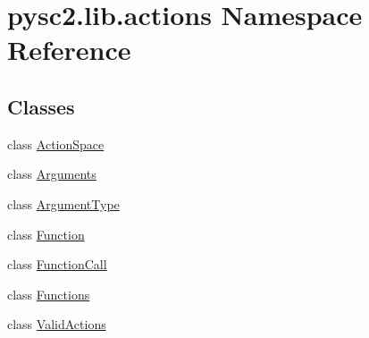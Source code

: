 \hypertarget{namespacepysc2_1_1lib_1_1actions}{}\section{pysc2.\+lib.\+actions Namespace Reference}
\label{namespacepysc2_1_1lib_1_1actions}
\subsection*{Classes}
\begin{DoxyCompactItemize}
\item 
class \mbox{\hyperlink{classpysc2_1_1lib_1_1actions_1_1_action_space}{Action\+Space}}
\item 
class \mbox{\hyperlink{classpysc2_1_1lib_1_1actions_1_1_arguments}{Arguments}}
\item 
class \mbox{\hyperlink{classpysc2_1_1lib_1_1actions_1_1_argument_type}{Argument\+Type}}
\item 
class \mbox{\hyperlink{classpysc2_1_1lib_1_1actions_1_1_function}{Function}}
\item 
class \mbox{\hyperlink{classpysc2_1_1lib_1_1actions_1_1_function_call}{Function\+Call}}
\item 
class \mbox{\hyperlink{classpysc2_1_1lib_1_1actions_1_1_functions}{Functions}}
\item 
class \mbox{\hyperlink{classpysc2_1_1lib_1_1actions_1_1_valid_actions}{Valid\+Actions}}
\end{DoxyCompactItemize}
